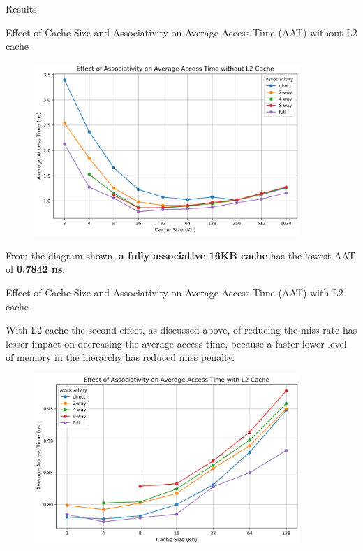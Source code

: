 \begin{section}{Results}
\begin{subsection}{Effect of Cache Size and Associativity on Average Access Time (AAT) without L2 cache }
        \begin{figure}[h!]
            \includegraphics[width=0.9\textwidth]{figures/fig2/fig2.png}
            \centering
            \label{fig:fig2}
        \end{figure}

        From the diagram shown, \textbf{a fully associative 16KB cache} has the lowest AAT of \textbf{0.7842 ns}.
    \end{subsection}

    \begin{subsection}{Effect of Cache Size and Associativity on Average Access Time (AAT) with L2 cache}
    
        With L2 cache the second effect, as discussed above, of reducing the miss rate has lesser impact on decreasing the average access time, because a faster lower level of memory in the hierarchy has reduced miss penalty.
        
        \begin{figure}[h!]
            \includegraphics[width=0.9\textwidth]{figures/fig3/fig3.png}
            \centering
            \label{fig:fig3}
        \end{figure}


\end{subsection}
\end{section}
